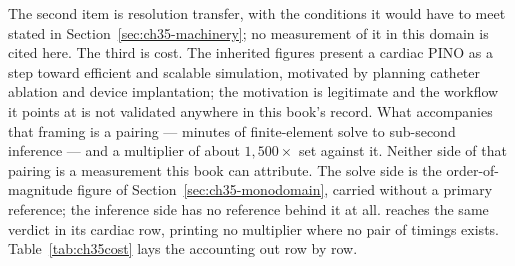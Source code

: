 The second item is resolution transfer, with the conditions it would have to meet
stated in Section~\ref{sec:ch35-machinery}; no measurement of it in this domain is cited
here. The third is cost. The inherited figures present a cardiac PINO as a step toward
efficient and scalable simulation, motivated by planning catheter
ablation and
device implantation; the motivation is legitimate and the workflow it points at is
not validated anywhere in this book's record. What accompanies that framing is a
pairing --- minutes of finite-element solve to sub-second inference --- and a
multiplier of about $1{,}500\times$ set against it. Neither side of that pairing
is a measurement this book can attribute. The solve side is the
order-of-magnitude figure of Section~\ref{sec:ch35-monodomain}, carried without a primary
reference; the inference side has no reference behind it at all.
reaches the same verdict in its cardiac row, printing no multiplier where no pair
of timings exists. Table~\ref{tab:ch35cost} lays the accounting out
row by row.
